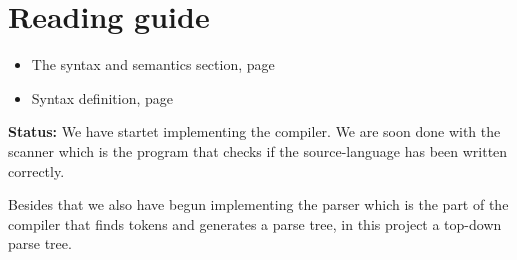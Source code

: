 \section{Reading guide}

\begin{itemize}
	\item The syntax and semantics section, page \pageref{analysis:syntax-and-semantics}
	\item Syntax definition, page \pageref{sec:anlysis:syntax-definition}
\end{itemize}

\textbf{Status:} We have startet implementing the compiler. We are soon done with the scanner which is the program that checks if the source-language has been written correctly.

Besides that we also have begun implementing the parser which is the part of the compiler that finds tokens and generates a parse tree, in this project a top-down parse tree.